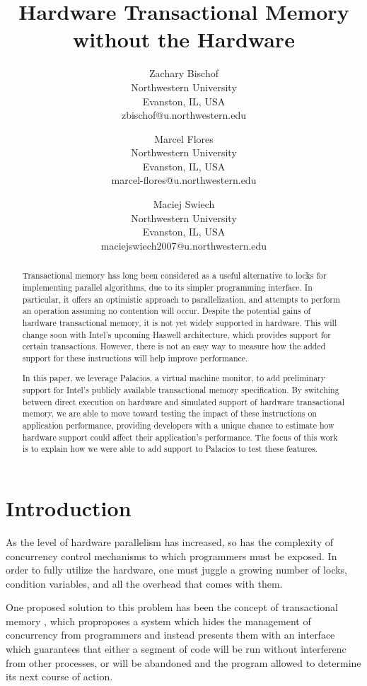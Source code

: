 \documentclass{acm_proc_article-sp}
\title{Hardware Transactional Memory without the Hardware}
\author{Zachary Bischof \\
	Northwestern University\\
	Evanston, IL, USA\\
	zbischof@u.northwestern.edu
	\and 
	Marcel Flores \\
	Northwestern University\\
	Evanston, IL, USA\\
	marcel-flores@u.northwestern.edu
	\and
	Maciej Swiech \\
	Northwestern University\\
	Evanston, IL, USA\\
	maciejswiech2007@u.northwestern.edu
    	\titlenote{Authors are listed in alphabetical order.}
        }
\begin{document}
\maketitle

\begin{abstract} 

Transactional memory has long been considered as a useful alternative to locks
for implementing parallel algorithms, due to its simpler programming interface.
In particular, it offers an optimistic approach to parallelization, and
attempts to perform an operation assuming no contention will occur. Despite the
potential gains of hardware transactional memory, it is not yet widely
supported in hardware. This will change soon with Intel's upcoming Haswell
architecture, which provides support for certain transactions. However, there
is not an easy way to measure how the added support for these instructions will
help improve performance.

In this paper, we leverage Palacios, a virtual machine monitor, to add
preliminary support for Intel's publicly available transactional memory
specification. By switching between direct execution on hardware and simulated
support of hardware transactional memory, we are able to move toward testing the impact of
these instructions on application performance, providing developers with a
unique chance to estimate how hardware support could affect their application's
performance. The focus of this work is to explain how we were able to add
support to Palacios to test these features.


\end{abstract}

\section{Introduction}
As the level of hardware parallelism has increased, so has the complexity of
concurrency control mechanisms to which programmers must be exposed. In order
to fully utilize the hardware, one must juggle a growing number of locks,
condition variables, and all the overhead that comes with them.

One proposed solution to this problem has been the concept of transactional
memory \cite{Herlihy:1993:TMA:173682.165164}, which proproposes a system
which hides the management of concurrency from programmers and instead
presents them with an interface which guarantees that either a segment of
code will be run without interferenc from other processes, or will be
abandoned and the program allowed to determine its next course of action.
 
\end{document}
